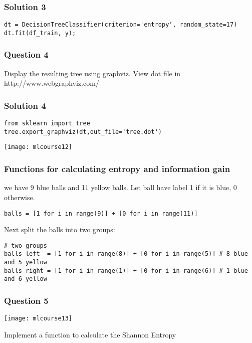\begin{frame}[fragile]\frametitle{Solution 3}	
\begin{lstlisting}
dt = DecisionTreeClassifier(criterion='entropy', random_state=17)
dt.fit(df_train, y);
\end{lstlisting}
\end{frame}

\begin{frame}[fragile]\frametitle{Question 4}	
Display the resulting tree using graphviz. View dot file in http://www.webgraphviz.com/
 
 \end{frame}

\begin{frame}[fragile]\frametitle{Solution 4}	
\begin{lstlisting}
from sklearn import tree
tree.export_graphviz(dt,out_file='tree.dot') 
\end{lstlisting}

\begin{center}
\texttt{[image: mlcourse12]}
\end{center}
\end{frame}

\begin{frame}[fragile]\frametitle{Functions for calculating entropy and information gain}	
we have 9 blue balls and 11 yellow balls. Let ball have label 1 if it is blue, 0 otherwise.
\begin{lstlisting}
balls = [1 for i in range(9)] + [0 for i in range(11)]
\end{lstlisting}
Next split the balls into two groups:
\begin{lstlisting}
# two groups
balls_left  = [1 for i in range(8)] + [0 for i in range(5)] # 8 blue and 5 yellow
balls_right = [1 for i in range(1)] + [0 for i in range(6)] # 1 blue and 6 yellow
\end{lstlisting}
\end{frame}

\begin{frame}[fragile]\frametitle{Question 5}	
\begin{center}
\texttt{[image: mlcourse13]}
\end{center}
Implement a function to calculate the Shannon Entropy
 \end{frame}

